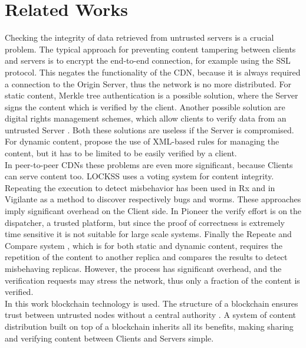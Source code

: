 \documentclass[conference,compsoc]{IEEEtran}
\begin{document}
\section{Related Works}
Checking the integrity of data retrieved from untrusted servers is a crucial problem. The typical approach for preventing content tampering between clients and servers is to encrypt the end-to-end connection, for example using the SSL protocol.
This negates the functionality of the CDN, because it is always required a connection to the Origin Server, thus the network is no more distributed. For static content, Merkle tree authentication \cite{bayardo2005merkle} is a possible solution, where the Server signs the content which is verified by the client. Another possible solution are digital rights management schemes, which allow clients to verify data from an untrusted Server \cite{adelsbach2005towards}. Both these solutions are useless if the Server is compromised. 
For dynamic content, \cite{chi2002xml}\cite{orman2001data} propose the use of XML-based rules for managing the content, but it has to be limited to be easily verified by a client.\\
In peer-to-peer CDNs these problems are even more significant, because Clients can serve content too. LOCKSS\cite{maniatis2003preserving} uses a voting system for content integrity. 
Repeating the execution to detect misbehavior has been used in Rx\cite{qin2005rx} and in Vigilante \cite{costa2005vigilante} as a method to discover respectively bugs and worms. These approaches imply significant overhead on the Client side. In Pioneer\cite{seshadri2005pioneer} the verify effort is on the dispatcher, a trusted platform, but since the proof of correctness is extremely time sensitive it is not suitable for large scale systems.
Finally the Repeate and Compare system \cite{michalakis2007ensuring}, which is for both static and dynamic content, requires the repetition of the content to another replica and compares the results to detect misbehaving replicas. However, the process has significant overhead, and the verification requests may stress the network, thus only a fraction of the content is verified.\\
In this work blockchain technology is used. The structure of a blockchain ensures trust between untrusted nodes without a central authority \cite{nakamoto2008bitcoin}. A system of content distribution built on top of a blockchain inherits all its benefits, making sharing and verifying content between Clients and Servers simple. 
\end{document}
